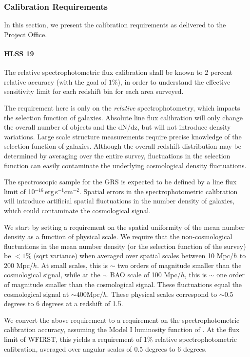 \subsubsection{Calibration Requirements} In this section, we present the calibration requirements as delivered to the Project Office.

\paragraph{HLSS 19} The relative spectrophotometric flux calibration shall be known to 2 percent relative accuracy (with the goal of 1\%), in order to understand the effective sensitivity limit for each redshift bin for each area surveyed.

 The requirement here is only on the {\it relative} spectrophotometry, which impacts the selection function of galaxies. Absolute line flux calibration will only change the overall number of objects and the dN/dz, but will not introduce
 density variations.  Large scale structure measurements require precise
 knowledge of the selection function of galaxies. Although the overall redshift
 distribution may be determined by averaging over the entire survey, fluctuations
 in the selection function can easily contaminate the underlying cosmological
 density fluctuations.

 The spectroscopic sample for the GRS is expected to be defined by a line flux
 limit of 10$^{-16}\,$erg$\,$s$^{-1}$cm$^{-2}$. Spatial errors in the spectrophotometric calibration
 will introduce artificial spatial fluctuations in the number density of
 galaxies, which could contaminate the cosmological signal.

 We start by setting a requirement on the spatial uniformity of the mean number
 density as a function of physical scale. We require that the non-cosmological
 fluctuations in the mean number density (or the selection function of the
 survey) be $< 1\%$ (sqrt variance) when averaged over spatial scales between 10
 Mpc/$h$ to 200 Mpc/$h$. At small scales, this is $\sim$ two orders of magnitude smaller
 than the cosmological signal, while at the $\sim$ BAO scale of 100 Mpc/$h$, this
 is $\sim$ one
 order of magnitude smaller than the cosmological signal.  These fluctuations
 equal the cosmological signal at $\sim400 \mathrm{Mpc}/h$.  These physical scales correspond
 to $\sim0.5$ degrees to 6 degrees at a redshift of 1.5.

 We convert the above requirement to a requirement on the spectrophotometric
 calibration accuracy, assuming the Model I luminosity function of \citet{Pozzetti:2016}. At the flux limit of WFIRST, this yields a requirement of 1\% relative spectrophotometric calibration, averaged over angular scales of 0.5 degrees to 6 degrees.

